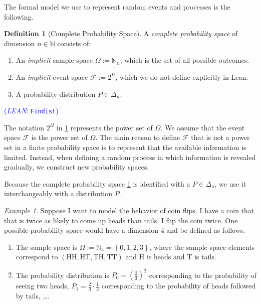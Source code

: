\documentclass[letterpaper]{article}
\theoremstyle{plain}
\theoremstyle{definition}
\newtheorem{definition}[theorem]{Definition}
\theoremstyle{remark}
\newtheorem{example}[theorem]{Example}
\newcommand{\Nats}{\mathbb{N}}
\newcommand{\PP}{\mathbb{P}}
\newcommand{\lean}[1]{\textcolor{blue}{(\emph{LEAN}: \texttt{#1})}}
\newcommand{\leanok}{}
\begin{document}
The formal model we use to represent random events and processes is the following.
\begin{definition}[Complete Probability Space] \label{def:probability-space}
  A \emph{complete probability space} of dimension $n \in \Nats$ consists of:
  \begin{enumerate}
    \item An \emph{implicit} sample space $\Omega := \Nats_n$, which is the set of all possible outcomes. 
    \item An \emph{implicit} event space $\mathcal{F} := 2^{\Omega}$, which we do not define explicitly in Lean. 
    \item A probability distribution $P \in \Delta_n$.
  \end{enumerate}
\lean{Findist} \leanok
\end{definition}
The notation $2^{\Omega}$ in \cref{def:probability-space} represents the power set of $\Omega$. We assume that the event space $\mathcal{F}$ is the power set of $\Omega$. The main reason to define $\mathcal{F}$ that is not a power set in a finite probability space is to represent that the available information is limited. Instead, when defining a random process in which information is revealed gradually, we construct new probability spaces. 

Because the complete probability space \cref{def:probability-space} is identified with a $P \in \Delta_n$, we use it interchangeably with a distribution $P$.




\begin{example} \label{exm:probability-space}
 Suppose I want to model the behavior of coin flips. I have a coin that that is twice as likely to come up heads than tails. I flip the coin twice. One possible probability space would have a dimension 4 and be defined as follows. 
  \begin{enumerate}
  \item The sample space is $\Omega := \Nats_4 = \left\{ 0, 1, 2, 3 \right\}$, where the sample space elements correspond to $ \left( \mathrm{HH}, \mathrm{HT}, \mathrm{TH}, \mathrm{TT} \right)$ and H is heads and T is tails. 
  \item The probability distribution is $P_0 = (\frac{2}{3})^2$ corresponding to the probability of seeing two heads, $P_1 = \frac{2}{3} \cdot \frac{1}{3}$ corresponding to the probability of heads followed by tails, \ldots.
  \end{enumerate}
\end{example}
\end{document}
